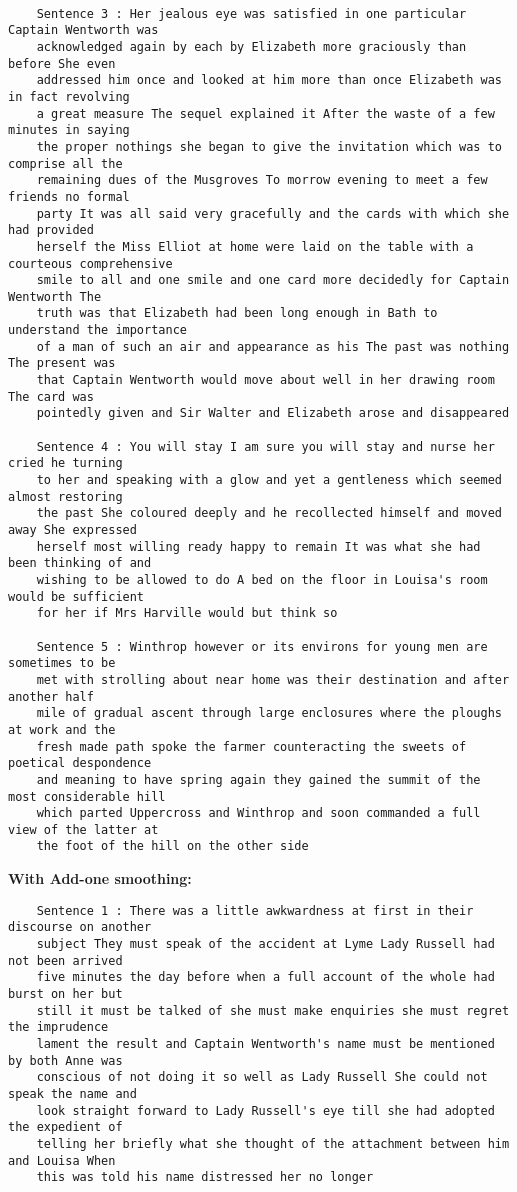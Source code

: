 \documentclass[11pt, a4paper]{article}
\begin{document}
\begin{enumerate}
\begin{verbatim}
	
	Sentence 3 : Her jealous eye was satisfied in one particular Captain Wentworth was 
	acknowledged again by each by Elizabeth more graciously than before She even 
	addressed him once and looked at him more than once Elizabeth was in fact revolving 
	a great measure The sequel explained it After the waste of a few minutes in saying 
	the proper nothings she began to give the invitation which was to comprise all the 
	remaining dues of the Musgroves To morrow evening to meet a few friends no formal 
	party It was all said very gracefully and the cards with which she had provided 
	herself the Miss Elliot at home were laid on the table with a courteous comprehensive 
	smile to all and one smile and one card more decidedly for Captain Wentworth The 
	truth was that Elizabeth had been long enough in Bath to understand the importance 
	of a man of such an air and appearance as his The past was nothing The present was 
	that Captain Wentworth would move about well in her drawing room The card was 
	pointedly given and Sir Walter and Elizabeth arose and disappeared
	
	Sentence 4 : You will stay I am sure you will stay and nurse her cried he turning 
	to her and speaking with a glow and yet a gentleness which seemed almost restoring 
	the past She coloured deeply and he recollected himself and moved away She expressed 
	herself most willing ready happy to remain It was what she had been thinking of and 
	wishing to be allowed to do A bed on the floor in Louisa's room would be sufficient 
	for her if Mrs Harville would but think so
	
	Sentence 5 : Winthrop however or its environs for young men are sometimes to be 
	met with strolling about near home was their destination and after another half 
	mile of gradual ascent through large enclosures where the ploughs at work and the 
	fresh made path spoke the farmer counteracting the sweets of poetical despondence 
	and meaning to have spring again they gained the summit of the most considerable hill 
	which parted Uppercross and Winthrop and soon commanded a full view of the latter at 
	the foot of the hill on the other side
	\end{verbatim}
	
	\textbf{With Add-one smoothing:}
	\begin{verbatim}
	Sentence 1 : There was a little awkwardness at first in their discourse on another 
	subject They must speak of the accident at Lyme Lady Russell had not been arrived 
	five minutes the day before when a full account of the whole had burst on her but 
	still it must be talked of she must make enquiries she must regret the imprudence 
	lament the result and Captain Wentworth's name must be mentioned by both Anne was 
	conscious of not doing it so well as Lady Russell She could not speak the name and 
	look straight forward to Lady Russell's eye till she had adopted the expedient of 
	telling her briefly what she thought of the attachment between him and Louisa When 
	this was told his name distressed her no longer
	

\end{verbatim}
\end{enumerate}
\end{document}
